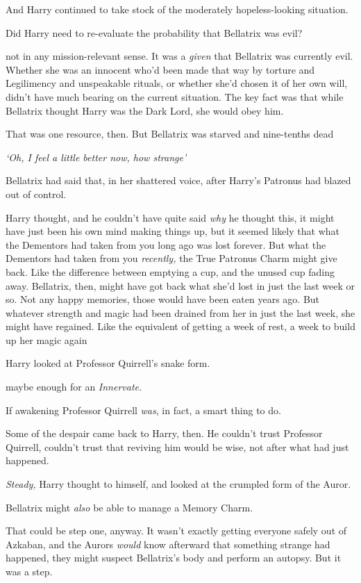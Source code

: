 And Harry continued to take stock of the moderately hopeless-looking situation.

Did Harry need to re-evaluate the probability that Bellatrix was evil?

{\el} not in any mission-relevant sense. It was a \emph{given} that Bellatrix
was currently evil. Whether she was an innocent who'd been made that way by
torture and Legilimency and unspeakable rituals, or whether she'd chosen it of
her own will, didn't have much bearing on the current situation. The key fact
was that while Bellatrix thought Harry was the Dark Lord, she would obey him.

That was one resource, then. But Bellatrix was starved and nine-tenths
dead{\el}

\emph{`Oh, I feel a little better now, how strange{\el}'}

Bellatrix had said that, in her shattered voice, after Harry's Patronus had
blazed out of control.

Harry thought, and he couldn't have quite said \emph{why} he thought this, it
might have just been his own mind making things up, but{\el} it seemed
likely that what the Dementors had taken from you long ago was lost forever.
But what the Dementors had taken from you \emph{recently,} the True Patronus
Charm might give back. Like the difference between emptying a cup, and the
unused cup fading away. Bellatrix, then, might have got back what she'd lost in
just the last week or so. Not any happy memories, those would have been eaten
years ago. But whatever strength and magic had been drained from her in just
the last week, she might have regained. Like the equivalent of getting a week
of rest, a week to build up her magic again{\el}

Harry looked at Professor Quirrell's snake form.

{\el} maybe enough for an \emph{Innervate.}

If awakening Professor Quirrell \emph{was}, in fact, a smart thing to do.

Some of the despair came back to Harry, then. He couldn't trust Professor
Quirrell, couldn't trust that reviving him would be wise, not after what had
just happened.

\emph{Steady,} Harry thought to himself, and looked at the crumpled form of the
Auror.

Bellatrix might \emph{also} be able to manage a Memory Charm.

That could be step one, anyway. It wasn't exactly getting everyone safely out
of Azkaban, and the Aurors \emph{would} know afterward that something strange
had happened, they might suspect Bellatrix's body and perform an autopsy. But
it was a step.

